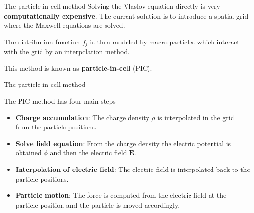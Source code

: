 \documentclass{beamer}
\newcommand*\V[1]{\bm{#1}}
\newcommand{\E}{\V{E}}
\begin{document}
\begin{frame}{The particle-in-cell method}{}
Solving the Vlaslov equation directly is very \textbf{computationally 
expensive}. The current solution is to introduce a spatial grid where the 
Maxwell equations are solved.

\vspace{1em}
The distribution function $f_j$ is then modeled by macro-particles which 
interact with the grid by an interpolation method.

\vspace{1em}
This method is known as \textbf{particle-in-cell} (PIC).
\end{frame}

\begin{frame}{The particle-in-cell method}{}

The PIC method has four main steps

\begin{itemize}
\setlength\itemsep{1em}
\item \textbf{Charge accumulation}: The charge density $\rho$ is interpolated in 
the grid from the particle positions.
\pause
\item \textbf{Solve field equation}: From the charge density the electric 
potential is obtained $\phi$ and then the electric field $\E$.
\pause
\item \textbf{Interpolation of electric field}: The electric field is  
interpolated back to the particle positions.
\pause
\item \textbf{Particle motion}: The force is computed from the electric field at 
the particle position and the particle is moved accordingly.
\end{itemize}
\end{frame}
\end{document}
